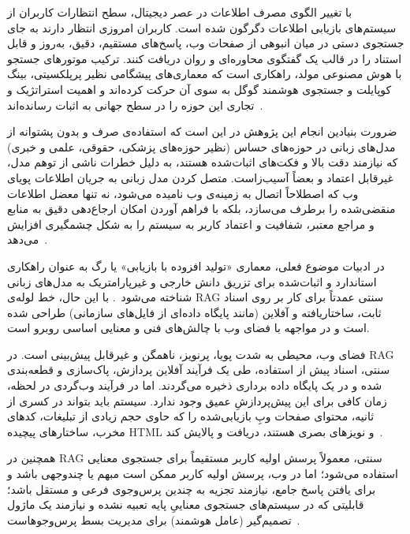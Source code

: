 
با تغییر الگوی مصرف اطلاعات در عصر دیجیتال، سطح انتظارات کاربران از سیستم‌های بازیابی اطلاعات دگرگون شده است. کاربران امروزی انتظار دارند به جای جستجوی دستی در میان انبوهی از صفحات وب، پاسخ‌های مستقیم، دقیق، به‌روز و قابل استناد را در قالب یک گفتگوی محاوره‌ای و روان دریافت کنند. ترکیب موتورهای جستجو با هوش مصنوعی مولد، راهکاری است که معماری‌های پیشگامی نظیر پرپلکسیتی، بینگ کوپایلت و جستجوی هوشمند گوگل به سوی آن حرکت کرده‌اند و اهمیت استراتژیک و تجاری این حوزه را در سطح جهانی به اثبات رسانده‌اند~.

ضرورت بنیادین انجام این پژوهش در این است که استفاده‌ی صرف و بدون پشتوانه از مدل‌های زبانی در حوزه‌های حساس (نظیر حوزه‌های پزشکی، حقوقی، علمی و خبری) که نیازمند دقت بالا و فکت‌های اثبات‌شده هستند، به دلیل خطرات ناشی از توهم مدل، غیرقابل اعتماد و بعضاً آسیب‌زاست. متصل کردن مدل زبانی به جریان اطلاعات پویای وب که اصطلاحاً اتصال به زمینه‌ی وب نامیده می‌شود، نه تنها معضل اطلاعات منقضی‌شده را برطرف می‌سازد، بلکه با فراهم آوردن امکان ارجاع‌دهی دقیق به منابع و مراجع معتبر، شفافیت و اعتماد کاربر به سیستم را به شکل چشمگیری افزایش می‌دهد~.


در ادبیات موضوع فعلی، معماری «تولید افزوده با بازیابی» یا رگ به عنوان راهکاری استاندارد و اثبات‌شده برای تزریق دانش خارجی و غیرپارامتریک به مدل‌های زبانی شناخته می‌شود~. با این حال، خط لوله‌ی RAG سنتی عمدتاً برای کار بر روی اسناد ثابت، ساختاریافته و آفلاین (مانند پایگاه داده‌ای از فایل‌های سازمانی) طراحی شده است و در مواجهه با فضای وب با چالش‌های فنی و معنایی اساسی روبرو است.

فضای وب، محیطی به شدت پویا، پرنویز، ناهمگن و غیرقابل پیش‌بینی است. در RAG سنتی، اسناد پیش از استفاده، طی یک فرآیند آفلاین پردازش، پاک‌سازی و قطعه‌بندی شده و در یک پایگاه داده برداری ذخیره می‌گردند. اما در فرآیند وب‌گردی در لحظه، زمان کافی برای این پیش‌پردازشِ عمیق وجود ندارد. سیستم باید بتواند در کسری از ثانیه، محتوای صفحات وبِ بازیابی‌شده را که حاوی حجم زیادی از تبلیغات، کدهای مخرب، ساختارهای پیچیده HTML و نویزهای بصری هستند، دریافت و پالایش کند~. 

همچنین در RAG سنتی، معمولاً پرسش اولیه کاربر مستقیماً برای جستجوی معنایی استفاده می‌شود؛ اما در وب، پرسش اولیه کاربر ممکن است مبهم یا چندوجهی باشد و برای یافتن پاسخ جامع، نیازمند تجزیه به چندین پرس‌وجوی فرعی و مستقل باشد؛ قابلیتی که در سیستم‌های جستجوی معناییِ پایه تعبیه نشده و نیازمند یک ماژول تصمیم‌گیر (عامل هوشمند) برای مدیریت بسط پرس‌وجوهاست~.

